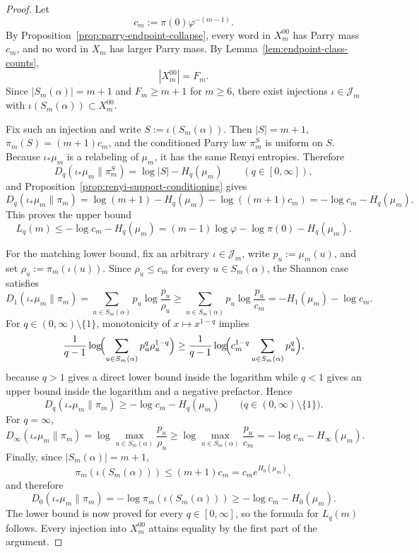 \documentclass[11pt,letterpaper]{article}
\numberwithin{equation}{section}
\theoremstyle{plain}
\theoremstyle{definition}
\theoremstyle{remark}
\begin{document}
\begin{proof}
Let
\[
c_m:=\pi(0)\varphi^{-(m-1)}.
\]
By Proposition~\ref{prop:parry-endpoint-collapse}, every word in \(X_m^{00}\)
has Parry mass \(c_m\), and no word in \(X_m\) has larger Parry mass. By
Lemma~\ref{lem:endpoint-class-counts},
\[
|X_m^{00}|=F_m.
\]
Since \(|S_m(\alpha)|=m+1\) and \(F_m\ge m+1\) for \(m\ge 6\), there exist
injections \(\iota\in\mathcal J_m\) with \(\iota(S_m(\alpha))\subset X_m^{00}\).

Fix such an injection and write \(S:=\iota(S_m(\alpha))\). Then \(|S|=m+1\),
\(\pi_m(S)=(m+1)c_m\), and the conditioned Parry law \(\pi_m^S\) is uniform on
\(S\). Because \(\iota_*\mu_m\) is a relabeling of \(\mu_m\), it has the same
Renyi entropies. Therefore
\[
D_q(\iota_*\mu_m\|\pi_m^S)=\log|S|-H_q(\mu_m)
\qquad (q\in[0,\infty]),
\]
and Proposition~\ref{prop:renyi-support-conditioning} gives
\[
D_q(\iota_*\mu_m\|\pi_m)
=
\log(m+1)-H_q(\mu_m)-\log((m+1)c_m)
=
-\log c_m-H_q(\mu_m).
\]
This proves the upper bound
\[
L_q(m)\le -\log c_m-H_q(\mu_m)
=(m-1)\log\varphi-\log\pi(0)-H_q(\mu_m).
\]

For the matching lower bound, fix an arbitrary \(\iota\in\mathcal J_m\), write
\(p_u:=\mu_m(u)\), and set \(\rho_u:=\pi_m(\iota(u))\). Since \(\rho_u\le c_m\)
for every \(u\in S_m(\alpha)\), the Shannon case satisfies
\[
D_1(\iota_*\mu_m\|\pi_m)
=
\sum_{u\in S_m(\alpha)}p_u\log\frac{p_u}{\rho_u}
\ge
\sum_{u\in S_m(\alpha)}p_u\log\frac{p_u}{c_m}
=
-H_1(\mu_m)-\log c_m.
\]
For \(q\in(0,\infty)\setminus\{1\}\), monotonicity of \(x\mapsto x^{1-q}\)
implies
\[
\frac{1}{q-1}\log\!\Bigl(\sum_{u\in S_m(\alpha)}p_u^q\rho_u^{1-q}\Bigr)
\ge
\frac{1}{q-1}\log\!\Bigl(c_m^{1-q}\sum_{u\in S_m(\alpha)}p_u^q\Bigr),
\]
because \(q>1\) gives a direct lower bound inside the logarithm while
\(q<1\) gives an upper bound inside the logarithm and a negative prefactor.
Hence
\[
D_q(\iota_*\mu_m\|\pi_m)\ge -\log c_m-H_q(\mu_m)
\qquad \bigl(q\in(0,\infty)\setminus\{1\}\bigr).
\]
For \(q=\infty\),
\[
D_\infty(\iota_*\mu_m\|\pi_m)
=
\log\max_{u\in S_m(\alpha)}\frac{p_u}{\rho_u}
\ge
\log\max_{u\in S_m(\alpha)}\frac{p_u}{c_m}
=
-\log c_m-H_\infty(\mu_m).
\]
Finally, since \(|S_m(\alpha)|=m+1\),
\[
\pi_m(\iota(S_m(\alpha)))\le (m+1)c_m=c_m e^{H_0(\mu_m)},
\]
and therefore
\[
D_0(\iota_*\mu_m\|\pi_m)
=
-\log \pi_m(\iota(S_m(\alpha)))
\ge
-\log c_m-H_0(\mu_m).
\]
The lower bound is now proved for every \(q\in[0,\infty]\), so the formula for
\(L_q(m)\) follows. Every injection into \(X_m^{00}\) attains equality by the
first part of the argument.


\end{proof}
\end{document}

